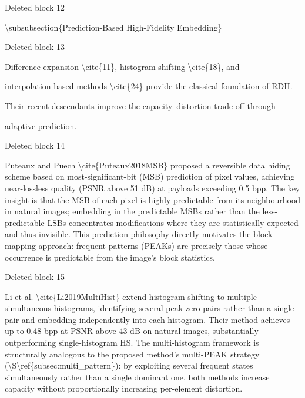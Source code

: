 \documentclass[a4paper,fleqn]{cas-dc}
\newenvironment{RevisionDeletion}{%
  \par\begingroup\color{revisionred}\footnotesize\ttfamily
  \setlength{\parindent}{0pt}\setlength{\parskip}{1pt}\obeyspaces
}{\par\endgroup}
\begin{document}
\begin{RevisionDeletion}
Deleted block 12\par
\textbackslash{}subsubsection\{Prediction-Based High-Fidelity Embedding\}\par
\end{RevisionDeletion}

\begin{RevisionDeletion}
Deleted block 13\par
Difference expansion \textbackslash{}cite\{11\}, histogram shifting \textbackslash{}cite\{18\}, and\par
interpolation-based methods \textbackslash{}cite\{24\} provide the classical foundation of RDH.\par
Their recent descendants improve the capacity--distortion trade-off through\par
adaptive prediction.\par
\end{RevisionDeletion}

\begin{RevisionDeletion}
Deleted block 14\par
Puteaux and Puech \textbackslash{}cite\{Puteaux2018MSB\} proposed a reversible data hiding scheme based on most-significant-bit (MSB) prediction of pixel values, achieving near-lossless quality (PSNR above 51 dB) at payloads exceeding 0.5 bpp. The key insight is that the MSB of each pixel is highly predictable from its neighbourhood in natural images; embedding in the predictable MSBs rather than the less-predictable LSBs concentrates modifications where they are statistically expected and thus invisible. This prediction philosophy directly motivates the block-mapping approach: frequent patterns (PEAKs) are precisely those whose occurrence is predictable from the image's block statistics.\par
\end{RevisionDeletion}

\begin{RevisionDeletion}
Deleted block 15\par
Li et al. \textbackslash{}cite\{Li2019MultiHist\} extend histogram shifting to multiple simultaneous histograms, identifying several peak-zero pairs rather than a single pair and embedding independently into each histogram. Their method achieves up to 0.48 bpp at PSNR above 43 dB on natural images, substantially outperforming single-histogram HS. The multi-histogram framework is structurally analogous to the proposed method's multi-PEAK strategy (\textbackslash{}S\textbackslash{}ref\{subsec:multi\_pattern\}): by exploiting several frequent states simultaneously rather than a single dominant one, both methods increase capacity without proportionally increasing per-element distortion.\par
\end{RevisionDeletion}
\end{document}
